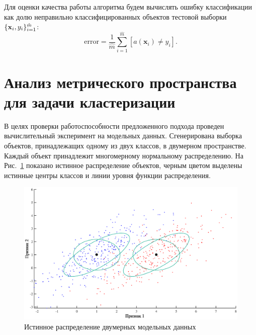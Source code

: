 Для оценки качества работы алгоритма будем вычислять ошибку классификации как долю неправильно классифицированных объектов тестовой выборки~$\{ \mathbf{x}_i, y_i \}_{i=1}^{\hat{m}}$:
\[
	\text{error} = \frac1{\hat{m}} \sum_{i = 1} ^ {\hat{m}} [a(\mathbf{x}_i) \ne y_i].
\]

\section{Анализ метрического пространства для задачи кластеризации}
\label{sec:ch5:exp_clustering}

В целях проверки работоспособности предложенного подхода проведен вычислительный эксперимент на модельных данных. Сгенерирована выборка объектов, принадлежащих одному из двух классов, в двумерном пространстве.
Каждый объект принадлежит многомерному нормальному распределению.
На Рис.~\ref{ch5:fig:true_distr} показано истинное распределение объектов, черным цветом выделены истинные центры классов и линии уровня функции распределения.

\begin{figure}[ht]
    \centering
    \includegraphics[width=\linewidth]{figs/ch5/true_distribution}
    \caption{Истинное распределение двумерных модельных данных}
    \label{ch5:fig:true_distr}
\end{figure}

